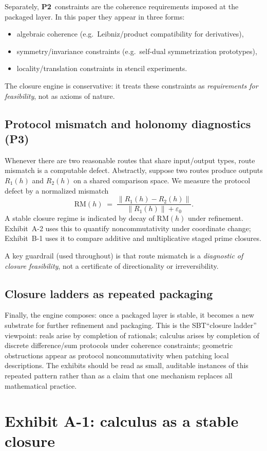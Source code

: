 \documentclass[apajournal,article,submit,moreauthors,pdftex]{Definitions/mdpi}
\newcommand{\SBT}{\textsc{SBT}}
\newcommand{\Ptwo}{\textbf{P2}}
\newcommand{\Pthree}{\textbf{P3}}
\begin{document}
Separately, \Ptwo\ constraints are the coherence requirements imposed at the packaged layer.
In this paper they appear in three forms:
\begin{itemize}
  \item algebraic coherence (e.g.\ Leibniz/product compatibility for derivatives),
  \item symmetry/invariance constraints (e.g.\ self-dual symmetrization prototypes),
  \item locality/translation constraints in stencil experiments.
\end{itemize}
The closure engine is conservative: it treats these constraints as \emph{requirements for feasibility}, not as axioms of nature.

\subsection{Protocol mismatch and holonomy diagnostics (\Pthree)}
Whenever there are two reasonable routes that share input/output types, route mismatch is a computable defect.
Abstractly, suppose two routes produce outputs $R_1(h)$ and $R_2(h)$ on a shared comparison space.
We measure the protocol defect by a normalized mismatch
\[
\mathrm{RM}(h)
\;=\;
\frac{\|R_1(h)-R_2(h)\|}{\|R_1(h)\|+\varepsilon_0}.
\]
A stable closure regime is indicated by decay of $\mathrm{RM}(h)$ under refinement.
Exhibit~A-2 uses this to quantify noncommutativity under coordinate change; Exhibit~B-1 uses it to compare additive and multiplicative staged prime closures.

A key guardrail (used throughout) is that route mismatch is a \emph{diagnostic of closure feasibility}, not a certificate of directionality or irreversibility.

\subsection{Closure ladders as repeated packaging}
Finally, the engine composes: once a packaged layer is stable, it becomes a new substrate for further refinement and packaging.
This is the \SBT ``closure ladder'' viewpoint:
reals arise by completion of rationals; calculus arises by completion of discrete difference/sum protocols under coherence constraints; geometric obstructions appear as protocol noncommutativity when patching local descriptions.
The exhibits should be read as small, auditable instances of this repeated pattern rather than as a claim that one mechanism replaces all mathematical practice.
 \section{Exhibit A-1: calculus as a stable closure}
\label{sec:exhibit-calculus}
\end{document}

